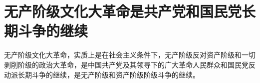 \section[无产阶级文化大革命是共产党和国民党长期斗争的继续（一九六八年三月）]{无产阶级文化大革命是共产党和国民党长期斗争的继续}


无产阶级文化大革命，实质上是在社会主义条件下，无产阶级反对资产阶级和一切剥削阶级的政治大革命，是中国共产党及其领导下的广大革命人民群众和国民党反动派长期斗争的继续，是无产阶级和资产阶级阶级斗争的继续。


